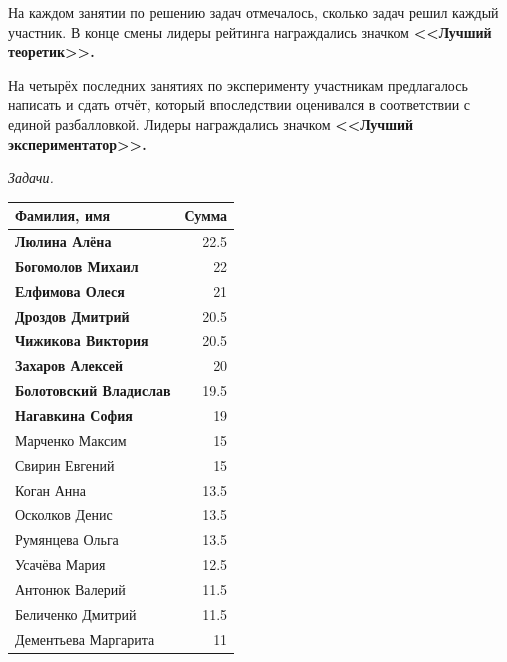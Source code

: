 \documentclass[12pt]{article}
\newlength{\h}
\newlength{\x}
\begin{document}
На каждом занятии по решению задач отмечалось, сколько задач решил
каждый участник. В конце смены лидеры рейтинга награждались значком
\textbf{<<Лучший теоретик>>.}

На четырёх последних занятиях по эксперименту участникам предлагалось
написать и сдать отчёт, который впоследствии оценивался в соответствии
с единой разбалловкой. Лидеры награждались значком \textbf{<<Лучший
  экспериментатор>>.}

\begin{table}[ht]
  \begin{minipage}[t]{0.48\linewidth}\centering
    \begin{center}
      \textit{Задачи.}
    \end{center}
    \begin{tabular}{|l|r|}
      \hline
      Фамилия, имя           &  Сумма  \\
      \hline
      \textbf{Люлина Алёна}           &   22.5  \\
      \hline
      \textbf{Богомолов Михаил}       &     22  \\
      \hline
      \textbf{Елфимова Олеся}         &     21  \\
      \hline
      \textbf{Дроздов Дмитрий}        &   20.5  \\
      \hline
      \textbf{Чижикова Виктория}      &   20.5  \\
      \hline
      \textbf{Захаров Алексей}        &     20  \\
      \hline
      \textbf{Болотовский Владислав}  &   19.5  \\
      \hline
      \textbf{Нагавкина София}        &     19  \\
      \hline
      Марченко Максим        &     15  \\
      \hline
      Свирин Евгений         &    15  \\
      \hline
      Коган Анна             &   13.5  \\
      \hline
      Осколков Денис         &   13.5  \\
      \hline
      Румянцева Ольга        &   13.5  \\
      \hline
      Усачёва Мария          &   12.5  \\
      \hline
      Антонюк Валерий        &   11.5  \\
      \hline
      Беличенко Дмитрий      &   11.5  \\
      \hline
      Дементьева Маргарита   &     11  \\

\end{tabular}
\end{minipage}
\end{table}
\end{document}
